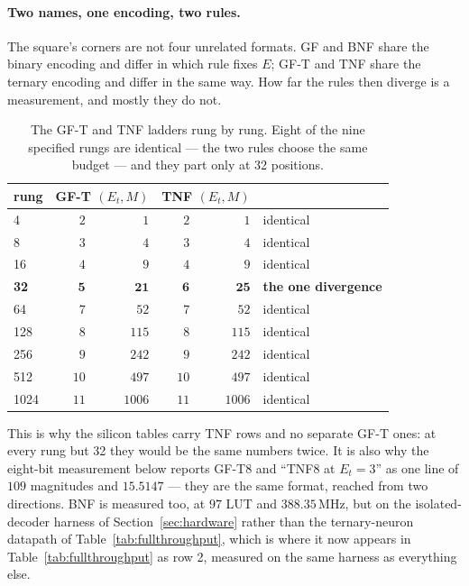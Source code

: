 \documentclass[11pt]{article}
\theoremstyle{definition}
\begin{document}
\paragraph{Two names, one encoding, two rules.} The square's corners are not
four unrelated formats. GF and BNF share the binary encoding and differ in which
rule fixes $E$; GF-T and TNF share the ternary encoding and differ in the same
way. How far the rules then diverge is a measurement, and mostly they do not.

\begin{table}[t]\centering
\caption{The GF-T and TNF ladders rung by rung. Eight of the nine specified
rungs are identical --- the two rules choose the same budget --- and they part
only at 32 positions.}
\label{tab:gftvstnf}
\begin{tabular}{lrrrrl}
\toprule
rung & \multicolumn{2}{c}{GF-T $(E_t, M)$} & \multicolumn{2}{c}{TNF $(E_t, M)$} & \\
\midrule
4    & $2$ & $1$    & $2$ & $1$    & identical \\
8    & $3$ & $4$    & $3$ & $4$    & identical \\
16   & $4$ & $9$    & $4$ & $9$    & identical \\
\textbf{32} & $\mathbf{5}$ & $\mathbf{21}$ & $\mathbf{6}$ & $\mathbf{25}$ & \textbf{the one divergence} \\
64   & $7$ & $52$   & $7$ & $52$   & identical \\
128  & $8$ & $115$  & $8$ & $115$  & identical \\
256  & $9$ & $242$  & $9$ & $242$  & identical \\
512  & $10$ & $497$ & $10$ & $497$ & identical \\
1024 & $11$ & $1006$& $11$ & $1006$& identical \\
\bottomrule
\end{tabular}
\end{table}

This is why the silicon tables carry TNF rows and no separate GF-T ones: at
every rung but 32 they would be the same numbers twice. It is also why the
eight-bit measurement below reports GF-T8 and ``TNF8 at $E_t=3$'' as one line
of $109$ magnitudes and $15.5147$ --- they are the same format, reached from two
directions. BNF is measured too, at $97$ LUT and $388.35$\,MHz, but on the
isolated-decoder harness of Section~\ref{sec:hardware} rather than the
ternary-neuron datapath of Table~\ref{tab:fullthroughput}, which is where
it now appears in Table~\ref{tab:fullthroughput} as row 2, measured on the
same harness as everything else.
\end{document}
